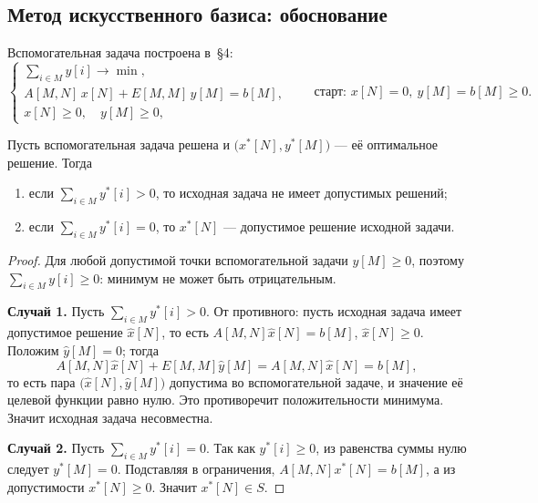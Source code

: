 \subsection{Метод искусственного базиса: обоснование}
\label{subsec:artificial-basis}

Вспомогательная задача построена в~\S4:
\[
  \begin{cases}
    \displaystyle\sum_{i \in M} y[i] \to \min , \\[6pt]
    A[M,N]\,x[N] + E[M,M]\,y[M] = b[M] , \\
    x[N] \ge 0 , \quad y[M] \ge 0 ,
  \end{cases}
  \qquad\text{старт: } x[N] = 0,\ y[M] = b[M] \ge 0 .
\]

\begin{theorem}\label{thm:artificial-basis}
Пусть вспомогательная задача решена и $\big(x^*[N], y^*[M]\big)$ — её
оптимальное решение. Тогда
\begin{enumerate}[label=\arabic*),left=0pt,nosep]
  \item если $\sum_{i \in M} y^*[i] > 0$, то исходная задача не имеет
        допустимых решений;
  \item если $\sum_{i \in M} y^*[i] = 0$, то $x^*[N]$ — допустимое решение
        исходной задачи.
\end{enumerate}
\end{theorem}

\begin{proof}
Для любой допустимой точки вспомогательной задачи $y[M] \ge 0$, поэтому
$\sum_{i\in M} y[i] \ge 0$: минимум не может быть отрицательным.

\medskip
\textbf{Случай 1.} Пусть $\sum_{i\in M} y^*[i] > 0$. От противного: пусть
исходная задача имеет допустимое решение $\hat{x}[N]$, то есть
$A[M,N]\hat{x}[N] = b[M]$, $\hat{x}[N] \ge 0$. Положим $\hat{y}[M] = 0$; тогда
\[
  A[M,N]\hat{x}[N] + E[M,M]\hat{y}[M] = A[M,N]\hat{x}[N] = b[M] ,
\]
то есть пара $\big(\hat{x}[N], \hat{y}[M]\big)$ допустима во вспомогательной
задаче, и значение её целевой функции равно нулю. Это противоречит
положительности минимума. Значит исходная задача несовместна.

\medskip
\textbf{Случай 2.} Пусть $\sum_{i\in M} y^*[i] = 0$. Так как $y^*[i] \ge 0$,
из равенства суммы нулю следует $y^*[M] = 0$. Подставляя в ограничения,
$A[M,N]x^*[N] = b[M]$, а из допустимости $x^*[N] \ge 0$. Значит
$x^*[N] \in S$.
\end{proof}

